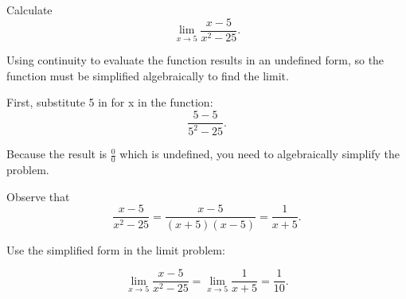 \documentclass{ximera}
\author{Emma Smith Zbarsky}
\begin{document}
\begin{exercise}

Calculate \[\lim_{x\to 5} \frac{x-5}{x^2-25}.\]


\begin{hint}
Using continuity to evaluate the function results in an undefined form,
so the function must be simplified algebraically to find the limit.
\end{hint}


\begin{hint}
{First, substitute 5 in for x in the function:
\[\frac{5-5}{5^2-25}.\]}

{Because the result is $\frac{0}{0}$ which is undefined, you
need to algebraically simplify the
problem.}

{Observe that
\[\frac{x-5}{x^2-25} = \frac{x-5}{(x+5)(x-5)} = \frac{1}{x+5}.\]}

{Use the simplified form in the limit
problem:}

\[\lim_{x\to 5} \frac{x-5}{x^2-25} = \lim_{x\to 5}\frac{1}{x+5} = \frac{1}{10}.\]
\end{hint}


\begin{multipleChoice}
\choice{$\infty$}
\end{multipleChoice}

\end{exercise}
\end{document}
